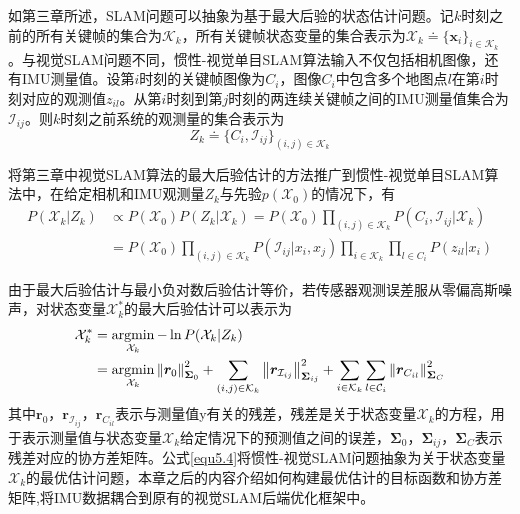 如第三章所述，SLAM问题可以抽象为基于最大后验的状态估计问题。记$k$时刻之前的所有关键帧的集合为$\mathcal{K}_k$，所有关键帧状态变量的集合表示为$\mathcal{X}_k \doteq \{\boldsymbol{x}_i\}_{i \in \mathcal{K}_k}$。与视觉SLAM问题不同，惯性-视觉单目SLAM算法输入不仅包括相机图像，还有IMU测量值。设第$i$时刻的关键帧图像为$C_i$，图像$C_i$中包含多个地图点$l$在第$i$时刻对应的观测值$z_{il}$。从第$i$时刻到第$j$时刻的两连续关键帧之间的IMU测量值集合为$\mathcal{I}_{ij}$。则$k$时刻之前系统的观测量的集合表示为
\begin{equation}
\label{equ5.2}
Z_k \doteq \{C_i,\mathcal{I}_{ij}\}_{(i,j) \in \mathcal{K}_k}
\end{equation}

将第三章中视觉SLAM算法的最大后验估计的方法推广到惯性-视觉单目SLAM算法中，在给定相机和IMU观测量$Z_k$与先验$p(\mathcal{X}_0)$的情况下，有
\begin{equation}
\label{equ5.3}
\begin{aligned}
P(\mathcal{X}_k | Z_k) & \varpropto P(\mathcal{X}_0)P(Z_k | \mathcal{X}_k) = P(\mathcal{X}_0) \prod\limits_{(i,j) \in \mathcal{K}_k} \! P \left( C_i,\mathcal{I}_{ij} | \mathcal{X}_k \right) \\
&=P(\mathcal{X}_0) \prod\limits_{(i,j) \in \mathcal{K}_k} P \left( \mathcal{I}_{ij} | x_i,x_j \right) \prod\limits_{i \in \mathcal{K}_k} \prod\limits_{l \in C_i}  P \left( z_{il} | x_i \right)
\end{aligned}
\end{equation}

由于最大后验估计与最小负对数后验估计等价，若传感器观测误差服从零偏高斯噪声，对状态变量$\mathcal{X}_k^*$的最大后验估计可以表示为
\begin{equation}
\label{equ5.4}
\begin{aligned}
\mathcal{X}_k^* & = \operatorname*{argmin}\limits_{\mathcal{X}_k}- \ln P(\mathcal{X}_k | Z_k) \\ 
& = \operatorname*{argmin}\limits_{\mathcal{X}_k} \left\Vert \boldsymbol{r}_0 \right\Vert_{\boldsymbol{\Sigma}_0}^2+ \sum\limits_{(i,j) \in \mathcal{K}_k}\left\Vert \boldsymbol{r}_{\mathcal{I}_{ij}} \right\Vert_{\boldsymbol{\Sigma}_{ij}}^2+ \sum\limits_{i \in \mathcal{K}_k}\sum\limits_{l \in \mathcal{C}_i} \left\Vert \boldsymbol{r}_{C_{il}} \right\Vert_{\boldsymbol{\Sigma}_{C}}^2
\end{aligned}
\end{equation}
其中$\boldsymbol{r}_0$，$ \boldsymbol{r}_{\mathcal{I}_{ij}}$，$\boldsymbol{r}_{C_{il}}$表示与测量值y有关的残差，残差是关于状态变量$\mathcal{X}_k$的方程，用于表示测量值与状态变量$\mathcal{X}_k$给定情况下的预测值之间的误差，$\boldsymbol{\Sigma}_0$，$ \boldsymbol{\Sigma}_{ij}$，$\boldsymbol{\Sigma}_C$表示残差对应的协方差矩阵。公式\eqref{equ5.4}将惯性-视觉SLAM问题抽象为关于状态变量$\mathcal{X}_k$的最优估计问题，本章之后的内容介绍如何构建最优估计的目标函数和协方差矩阵,将IMU数据耦合到原有的视觉SLAM后端优化框架中。


